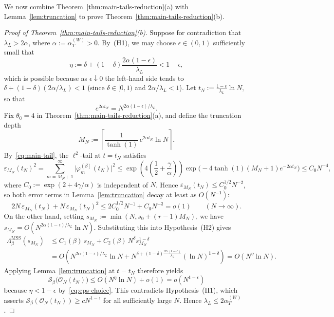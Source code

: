 \documentclass[11pt,a4paper]{article}
\numberwithin{equation}{section}
\theoremstyle{plain}
\theoremstyle{definition}
\newcommand{\MSS}{\mathrm{MSS}}
\begin{document}
We now combine Theorem~\ref{thm:main-tails-reduction}(a) with Lemma~\ref{lem:truncation} to prove Theorem~\ref{thm:main-tails-reduction}(b).

\begin{proof}[Proof of Theorem~\ref{thm:main-tails-reduction}(b)]
Suppose for contradiction that $\lambda_L > 2\alpha$, where $\alpha := \alpha_T^{(W)} > 0$. By~(H1), we may choose $\epsilon\in(0,1)$ sufficiently small that
\begin{equation}\label{eq:eps-choice}
  \eta := \delta + (1-\delta)\frac{2\alpha(1-\epsilon)}{\lambda_L} < 1-\epsilon,
\end{equation}
which is possible because as $\epsilon\downarrow 0$ the left-hand side tends to $\delta + (1-\delta)(2\alpha/\lambda_L) < 1$ (since $\delta\in[0,1)$ and $2\alpha/\lambda_L < 1$). Let $t_N := \frac{1-\epsilon}{\lambda_L}\ln N$, so that
\[
  e^{2\alpha t_N} = N^{2\alpha(1-\epsilon)/\lambda_L}.
\]
Fix $\theta_0 = 4$ in Theorem~\ref{thm:main-tails-reduction}(a), and define the truncation depth
\[
  M_N := \left\lceil \frac{1}{\tanh(1)}\,e^{2\alpha t_N}\ln N \right\rceil.
\]
By~\eqref{eq:main-tail}, the $\ell^2$-tail at $t = t_N$ satisfies
\[
  \varepsilon_{M_N}(t_N)^2 = \sum_{m=M_N+1}^\infty\bigl|\varphi_m^{(\beta)}(t_N)\bigr|^2
  \le \exp\!\left(4\left(\frac{1}{2}+\frac{\gamma}{\alpha}\right)\right)\exp\!\bigl(-4\tanh(1)(M_N+1)e^{-2\alpha t_N}\bigr)
  \le C_0 N^{-4},
\]
where $C_0 := \exp(2 + 4\gamma/\alpha)$ is independent of $N$. Hence $\varepsilon_{M_N}(t_N) \le C_0^{1/2} N^{-2}$, so both error terms in Lemma~\ref{lem:truncation} decay at least as $O(N^{-1})$:
\[
  2N\,\varepsilon_{M_N}(t_N) + N\,\varepsilon_{M_N}(t_N)^2 \le 2C_0^{1/2} N^{-1} + C_0 N^{-3} = o(1) \qquad (N\to\infty).
\]
On the other hand, setting $s_{M_N} := \min(N, s_0+(r-1)M_N)$, we have $s_{M_N} = O(N^{2\alpha(1-\epsilon)/\lambda_L}\ln N)$. Substituting this into Hypothesis~(H2) gives
\begin{align*}
  \Lambda_\beta^{\MSS}(s_{M_N})
  &\le C_1(\beta)\,s_{M_N} + C_2(\beta)\,N^\delta s_{M_N}^{1-\delta} \\
  &= O\!\left(N^{2\alpha(1-\epsilon)/\lambda_L}\ln N + N^{\delta + (1-\delta)\frac{2\alpha(1-\epsilon)}{\lambda_L}}(\ln N)^{1-\delta}\right)
  = O\!\left(N^\eta \ln N\right).
\end{align*}
Applying Lemma~\ref{lem:truncation} at $t = t_N$ therefore yields
\[
  \mathcal{S}_\beta\bigl(\mathcal{O}_N(t_N)\bigr) \le O\!\left(N^\eta \ln N\right) + o(1) = o\!\left(N^{1-\epsilon}\right)
\]
because $\eta < 1-\epsilon$ by~\eqref{eq:eps-choice}. This contradicts Hypothesis~(H1), which asserts $\mathcal{S}_\beta(\mathcal{O}_N(t_N)) \ge c N^{1-\epsilon}$ for all sufficiently large $N$. Hence $\lambda_L \le 2\alpha_T^{(W)}$.
\end{proof}
\end{document}
